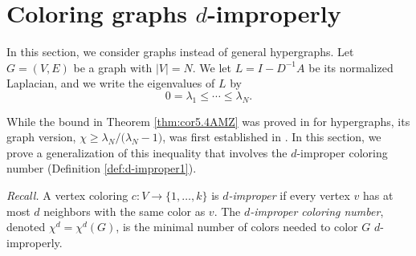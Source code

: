 \documentclass{article}
\theoremstyle{plain}
\theoremstyle{definition}
\theoremstyle{remark}
\begin{document}
\section{Coloring graphs \texorpdfstring{$d$}{d}-improperly}\label{sec:d-improper}

In this section, we consider graphs instead of general hypergraphs.
Let $G=(V,E)$ be a graph with $|V|=N$. We let $L=I-D^{-1}A$ be its normalized Laplacian, and we write the eigenvalues of $L$ by
\[
0=\lambda_1\leq \cdots \leq \lambda_N.
\]

While the bound in Theorem \ref{thm:cor5.4AMZ} was proved in \cite{Abiad20} for hypergraphs, its graph version, $\chi\geq \lambda_N/\bigl(\lambda_N-1\bigr)$, was first established in \cite{Gabriel-colouring}. In this section, we prove a generalization of this inequality that involves the $d$-improper coloring number (Definition \ref{def:d-improper1}).\newline


\emph{Recall.} A vertex coloring $c\colon V\to \{1,\ldots,k\}$ is \emph{$d$-improper} if every vertex $v$ has at most $d$ neighbors with the same color as $v$. The \emph{$d$-improper coloring number}, denoted $\chi^d=\chi^d(G)$, is the minimal number of colors needed to color $G$ $d$-improperly.\newline 
\end{document}
